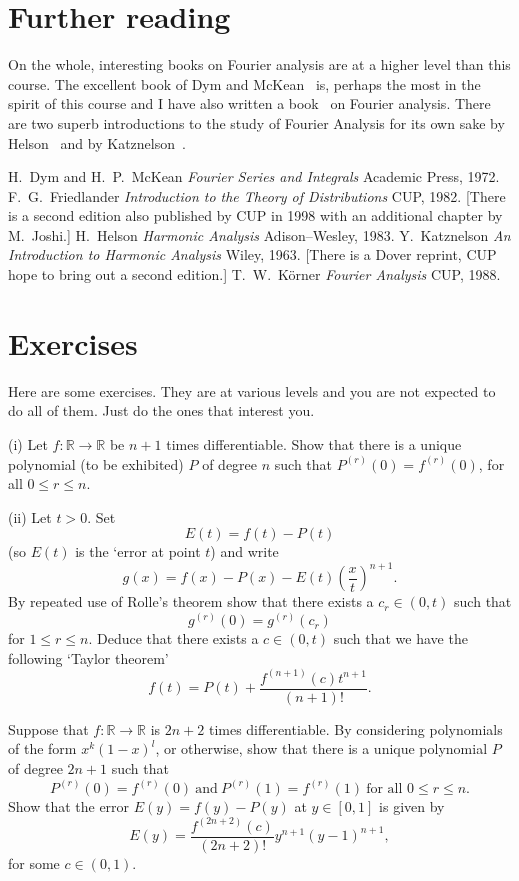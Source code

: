 \section{Further reading} On the whole, interesting books on
Fourier analysis are at a higher level than this course.
The excellent book of Dym and McKean~\cite{Dym} is, perhaps the
most in the spirit of this course and I have also written
a book~\cite{Korner1} on Fourier analysis. There are two
superb introductions to the study of Fourier Analysis
for its own sake by Helson~\cite{Helson} and
by Katznelson~\cite{Katznelson}.
\begin{thebibliography}{9}
 H.~Dym and H.~P.~McKean
\emph{Fourier Series and Integrals}
Academic Press, 1972.
 F.~G.~Friedlander
\emph{Introduction to the Theory of Distributions}
CUP, 1982. [There is a second edition
also published by CUP in 1998 with
an additional chapter by M.~Joshi.]
 H.~Helson
\emph{Harmonic Analysis}
Adison--Wesley, 1983.
 Y.~Katznelson
\emph{An Introduction to Harmonic Analysis}
Wiley, 1963. [There is a Dover reprint, CUP hope to
bring out a second edition.]
 T.~W.~K\"{o}rner
\emph{Fourier Analysis}
CUP, 1988.
\end{thebibliography}
\section{Exercises} Here are some exercises. They are at various
levels and you are not expected to do all of them. Just do the
ones that interest you.
\begin{question} (i) Let $f:{\mathbb R}\rightarrow{\mathbb R}$
be $n+1$ times differentiable. Show that there is a unique
polynomial (to be exhibited) $P$ of degree $n$ such that
$P^{(r)}(0)=f^{(r)}(0)$, for all $0\leq r\leq n$.

(ii) Let $t>0$. Set
\[E(t)=f(t)-P(t)\]
(so $E(t)$ is the `error at point $t$) and write
\[g(x)=f(x)-P(x)-E(t)\left(\frac{x}{t}\right)^{n+1}.\]
By repeated use of Rolle's theorem show that
there exists a $c_{r}\in(0,t)$ such that
\[g^{(r)}(0)=g^{(r)}(c_{r})\]
for $1\leq r\leq n$. Deduce that there exists a $c\in(0,t)$
such that we have the following `Taylor theorem'
\[f(t)=P(t)+\frac{f^{(n+1)}(c)t^{n+1}}{(n+1)!}.\]
\end{question}

\begin{question}
Suppose that $f:{\mathbb R}\rightarrow{\mathbb R}$
is $2n+2$ times differentiable. By considering polynomials
of the form $x^{k}(1-x)^{l}$, or otherwise, show that
there is a unique polynomial $P$ of degree $2n+1$
such that
\[P^{(r)}(0)=f^{(r)}(0)\ \text{and}\ P^{(r)}(1)=f^{(r)}(1)
\ \text{for all $0\leq r\leq n$}.\]
Show that the error $E(y)=f(y)-P(y)$ at $y\in[0,1]$
is given by
\[E(y)=\frac{f^{(2n+2)}(c)}{(2n+2)!}y^{n+1}(y-1)^{n+1},\]
for some $c\in(0,1)$.
\end{question}


